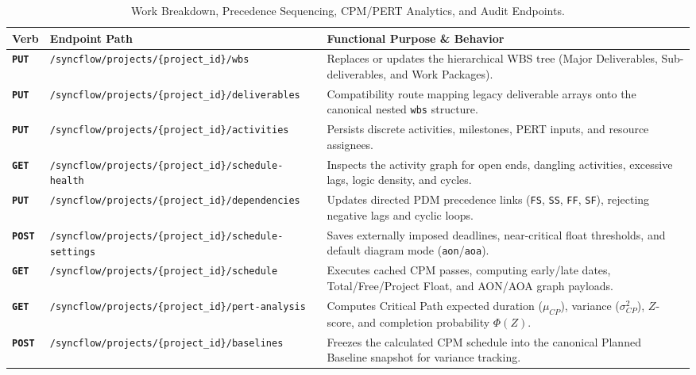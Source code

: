 \begin{table}[H]
\centering
\small
\setlength{\tabcolsep}{5pt}
\renewcommand{\arraystretch}{1.28}
\caption*{Work Breakdown, Precedence Sequencing, CPM/PERT Analytics, and Audit Endpoints.}
\vspace{-2pt}
\begin{tabularx}{\textwidth}{p{1.3cm} >{\raggedright\arraybackslash}p{6.0cm} X}
\toprule
\textbf{Verb} & \textbf{Endpoint Path} & \textbf{Functional Purpose \& Behavior} \\
\midrule
\textbf{\texttt{PUT}} & \texttt{/syncflow/projects/\{project\_id\}/\allowbreak wbs} & Replaces or updates the hierarchical WBS tree (Major Deliverables, Sub-deliverables, and Work Packages). \\
\textbf{\texttt{PUT}} & \texttt{/syncflow/projects/\{project\_id\}/\allowbreak deliverables} & Compatibility route mapping legacy deliverable arrays onto the canonical nested \texttt{wbs} structure. \\
\textbf{\texttt{PUT}} & \texttt{/syncflow/projects/\{project\_id\}/\allowbreak activities} & Persists discrete activities, milestones, PERT inputs, and resource assignees. \\
\textbf{\texttt{GET}} & \texttt{/syncflow/projects/\{project\_id\}/\allowbreak schedule-health} & Inspects the activity graph for open ends, dangling activities, excessive lags, logic density, and cycles. \\
\textbf{\texttt{PUT}} & \texttt{/syncflow/projects/\{project\_id\}/\allowbreak dependencies} & Updates directed PDM precedence links (\texttt{FS}, \texttt{SS}, \texttt{FF}, \texttt{SF}), rejecting negative lags and cyclic loops. \\
\textbf{\texttt{POST}} & \texttt{/syncflow/projects/\{project\_id\}/\allowbreak schedule-settings} & Saves externally imposed deadlines, near-critical float thresholds, and default diagram mode (\texttt{aon}/\texttt{aoa}). \\
\textbf{\texttt{GET}} & \texttt{/syncflow/projects/\{project\_id\}/\allowbreak schedule} & Executes cached CPM passes, computing early/late dates, Total/Free/Project Float, and AON/AOA graph payloads. \\
\textbf{\texttt{GET}} & \texttt{/syncflow/projects/\{project\_id\}/\allowbreak pert-analysis} & Computes Critical Path expected duration ($\mu_{CP}$), variance ($\sigma_{CP}^2$), $Z$-score, and completion probability $\Phi(Z)$. \\
\textbf{\texttt{POST}} & \texttt{/syncflow/projects/\{project\_id\}/\allowbreak baselines} & Freezes the calculated CPM schedule into the canonical Planned Baseline snapshot for variance tracking. \\

\end{tabularx}
\end{table}
